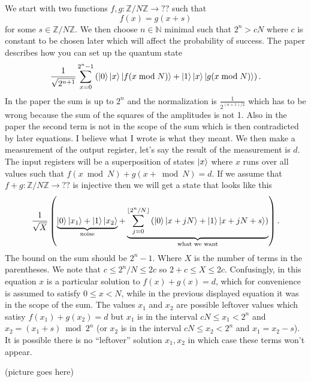 \documentclass[10pt]{article}
\theoremstyle{plain}
\theoremstyle{definition}
\newcommand{\N}{\mathbb{N}}
\newcommand{\Z}{\mathbb{Z}}
\begin{document}
We start with two functions \( f, g: \Z / N\Z \to ?? \) such that
\[
    f(x) = g(x+s)
\]
for some \( s \in \Z / N\Z \).
We then choose \( n \in \N \) minimal such that \( 2^n > cN \) where \( c \) is constant to be chosen later which will affect the probability of success. The paper describes how you can set up the quantum state
\[
    \frac{1}{\sqrt{2^{n+1}}} \sum_{x=0}^{2^n-1} \left( \ket{0}\ket{x}\ket{f(x \bmod{N})} + \ket{1}\ket{x}\ket{g(x \bmod{N})} \right).
\]
{
\color{red} In the paper the sum is up to \( 2^n \) and the normalization is \( \frac{1}{2^{(n+1) / 2}} \) which has to be wrong because the sum of the squares of the amplitudes is not 1.
Also in the paper the second term is not in the scope of the sum which is then contradicted by later equations.
I believe what I wrote is what they meant.
}
We then make a measurement of the output register, let's say the result of the measurement is \( d \). The input registers will be a superposition of states \( \ket{x} \) where \( x \) runs over all values such that \( f(x \bmod{N}) + g(x + \bmod{N}) = d\). If we assume that \( f+g : \Z / N\Z \to ?? \) is injective then we will get a state that looks like this
\[
    \frac{1}{\sqrt{X}}
    \left(
    \underbrace{\ket{0}\ket{x_1} + \ket{1}\ket{x_2}}_{\text{noise}} +
    \underbrace{\sum_{j=0}^{\lfloor 2^n / N \rfloor }
        \left(
        \ket{0}\ket{x + jN}+ \ket{1}\ket{x + jN + s} \right)}_{\text{what we want}}
    \right).
\]
{
\color{red} The bound on the sum should be \( 2^n - 1 \).
}
Where \( X \) is the number of terms in the parentheses.
We note that \( c \leq 2^n / N \leq 2c \) so \( 2+c \leq X \leq 2c \).
Confusingly, in this equation \( x \) is a particular solution to \( f(x) + g(x) = d \), which for convenience is assumed to satisfy \( 0 \leq x < N \), while in the previous displayed equation it was in the scope of the sum.
The values \( x_1 \) and \( x_2 \) are possible leftover values which satisy \( f(x_1) + g(x_2) = d \) but \( x_1 \) is in the interval \( cN \leq x_1 < 2^n  \) and \( x_2 = (x_1 + s) \bmod{2^n} \) (or \( x_2 \) is in the interval \( cN \leq x_2 < 2^n  \) and \( x_1 = x_2 - s \)).
It is possible there is no ``leftover'' solution \( x_1, x_2 \) in which case these terms won't appear.

\begin{center}
    (picture goes here)
\end{center}
\end{document}

